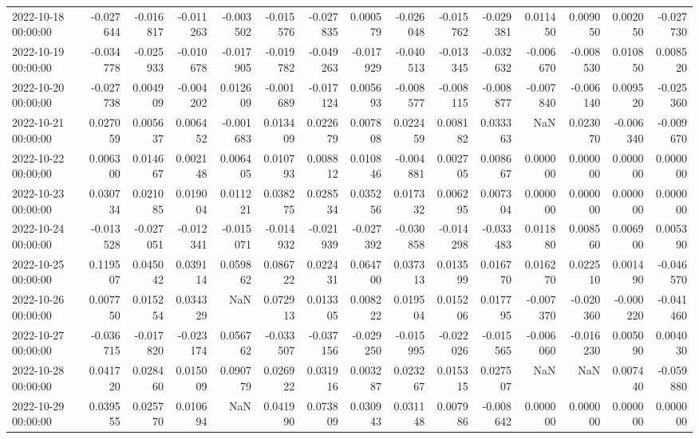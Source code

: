\begin{tabular}{lrrrrrrrrrrrrrr}
2022-10-18 00:00:00 & -0.027644 & -0.016817 & -0.011263 & -0.003502 & -0.015576 & -0.027835 & 0.000579 & -0.026048 & -0.015762 & -0.029381 & 0.011450 & 0.009050 & 0.002050 & -0.027730 \\
2022-10-19 00:00:00 & -0.034778 & -0.025933 & -0.010678 & -0.017905 & -0.019782 & -0.049263 & -0.017929 & -0.040513 & -0.013345 & -0.032632 & -0.006670 & -0.008530 & 0.010850 & 0.008520 \\
2022-10-20 00:00:00 & -0.027738 & 0.004909 & -0.004202 & 0.012609 & -0.001689 & -0.017124 & 0.005693 & -0.008577 & -0.008115 & -0.008877 & -0.007840 & -0.006140 & 0.009520 & -0.025360 \\
2022-10-21 00:00:00 & 0.027059 & 0.005637 & 0.006452 & -0.001683 & 0.013409 & 0.022679 & 0.007808 & 0.022459 & 0.008182 & 0.033363 & NaN & 0.023070 & -0.006340 & -0.009670 \\
2022-10-22 00:00:00 & 0.006300 & 0.014667 & 0.002148 & 0.006405 & 0.010793 & 0.008812 & 0.010846 & -0.004881 & 0.002705 & 0.008667 & 0.000000 & 0.000000 & 0.000000 & 0.000000 \\
2022-10-23 00:00:00 & 0.030734 & 0.021085 & 0.019004 & 0.011221 & 0.038275 & 0.028534 & 0.035256 & 0.017332 & 0.006295 & 0.007304 & 0.000000 & 0.000000 & 0.000000 & 0.000000 \\
2022-10-24 00:00:00 & -0.013528 & -0.027051 & -0.012341 & -0.015071 & -0.014932 & -0.021939 & -0.027392 & -0.030858 & -0.014298 & -0.033483 & 0.011880 & 0.008560 & 0.006900 & 0.005390 \\
2022-10-25 00:00:00 & 0.119507 & 0.045042 & 0.039114 & 0.059862 & 0.086722 & 0.022431 & 0.064700 & 0.037313 & 0.013599 & 0.016770 & 0.016270 & 0.022510 & 0.001490 & -0.046570 \\
2022-10-26 00:00:00 & 0.007750 & 0.015254 & 0.034329 & NaN & 0.072913 & 0.013305 & 0.008222 & 0.019504 & 0.015206 & 0.017795 & -0.007370 & -0.020360 & -0.000220 & -0.041460 \\
2022-10-27 00:00:00 & -0.036715 & -0.017820 & -0.023174 & 0.056762 & -0.033507 & -0.037156 & -0.029250 & -0.015995 & -0.022026 & -0.015565 & -0.006060 & -0.016230 & 0.005090 & 0.004030 \\
2022-10-28 00:00:00 & 0.041720 & 0.028460 & 0.015009 & 0.090779 & 0.026922 & 0.031916 & 0.003287 & 0.023267 & 0.015315 & 0.027507 & NaN & NaN & 0.007440 & -0.059880 \\
2022-10-29 00:00:00 & 0.039555 & 0.025770 & 0.010694 & NaN & 0.041990 & 0.073809 & 0.030943 & 0.031148 & 0.007986 & -0.008642 & 0.000000 & 0.000000 & 0.000000 & 0.000000 \\

\end{tabular}
